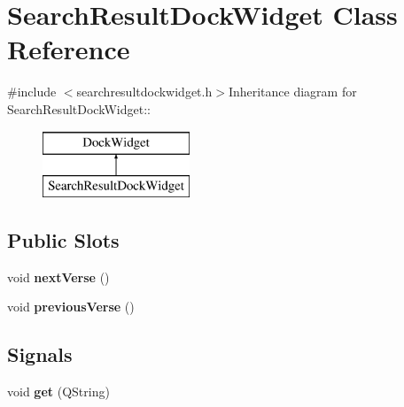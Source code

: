 \hypertarget{classSearchResultDockWidget}{
\section{SearchResultDockWidget Class Reference}
\label{classSearchResultDockWidget}
}


{\ttfamily \#include $<$searchresultdockwidget.h$>$}Inheritance diagram for SearchResultDockWidget::\begin{figure}[H]
\begin{center}
\leavevmode
\includegraphics[height=2cm]{classSearchResultDockWidget}
\end{center}
\end{figure}
\subsection*{Public Slots}
\begin{DoxyCompactItemize}
\item 
\hypertarget{classSearchResultDockWidget_ab87a521289dcf8e14b1e35067e930d3e}{
void {\bfseries nextVerse} ()}
\label{classSearchResultDockWidget_ab87a521289dcf8e14b1e35067e930d3e}

\item 
\hypertarget{classSearchResultDockWidget_a9574dd6d9cb39058c035104ac94d9873}{
void {\bfseries previousVerse} ()}
\label{classSearchResultDockWidget_a9574dd6d9cb39058c035104ac94d9873}

\end{DoxyCompactItemize}
\subsection*{Signals}
\begin{DoxyCompactItemize}
\item 
\hypertarget{classSearchResultDockWidget_a0b26a9693ee123e043d0ab3b374a8d0f}{
void {\bfseries get} (QString)}
\label{classSearchResultDockWidget_a0b26a9693ee123e043d0ab3b374a8d0f}

\end{DoxyCompactItemize}
